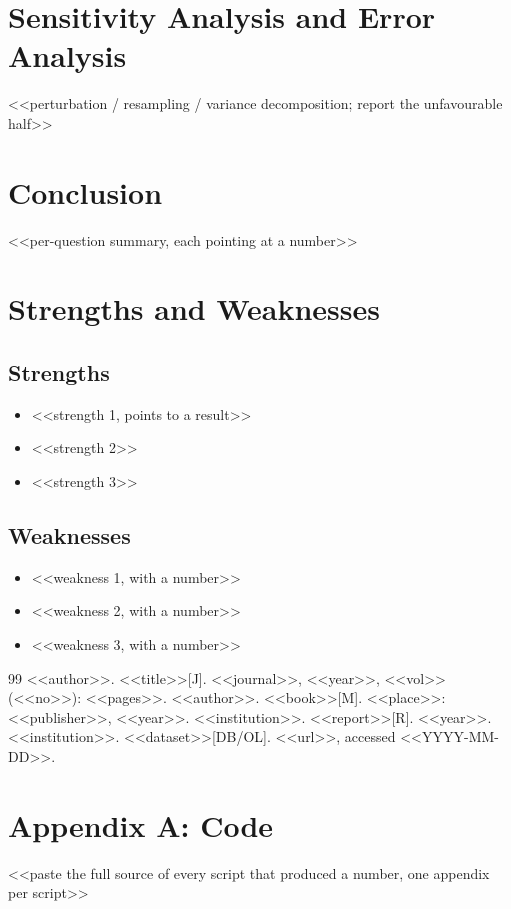 \documentclass{swmcmthesis}
\begin{document}
\section{Sensitivity Analysis and Error Analysis}
<<perturbation / resampling / variance decomposition; report the unfavourable half>>
\section{Conclusion}
<<per-question summary, each pointing at a number>>
\section{Strengths and Weaknesses}
\subsection{Strengths}
\begin{itemize}
  \item <<strength 1, points to a result>>
  \item <<strength 2>>
  \item <<strength 3>>
\end{itemize}
\subsection{Weaknesses}
\begin{itemize}
  \item <<weakness 1, with a number>>
  \item <<weakness 2, with a number>>
  \item <<weakness 3, with a number>>
\end{itemize}

\begin{thebibliography}{99}
 <<author>>. <<title>>[J]. <<journal>>, <<year>>, <<vol>>(<<no>>): <<pages>>.
 <<author>>. <<book>>[M]. <<place>>: <<publisher>>, <<year>>.
 <<institution>>. <<report>>[R]. <<year>>.
 <<institution>>. <<dataset>>[DB/OL]. <<url>>, accessed <<YYYY-MM-DD>>.
\end{thebibliography}

\appendix
\section{Appendix A: Code}
%
<<paste the full source of every script that produced a number, one appendix per script>>
\end{document}
